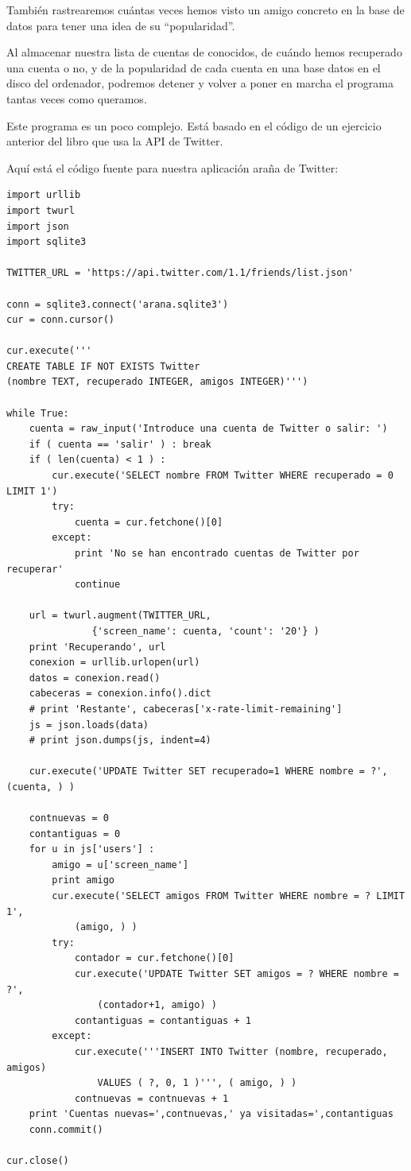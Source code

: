 También rastrearemos cuántas veces hemos visto un amigo concreto en la
base de datos para tener una idea de su ``popularidad''.

Al almacenar nuestra lista de cuentas de conocidos,
de cuándo hemos recuperado una cuenta o no,
y de la popularidad de cada cuenta
en una base datos en el disco del ordenador,
podremos detener y volver a poner en marcha el programa tantas veces como queramos. 

Este programa es un poco complejo. Está basado en el código
de un ejercicio anterior del libro que usa la
API de Twitter.

Aquí está el código fuente para nuestra aplicación araña de Twitter:

\beforeverb
\begin{verbatim}
import urllib
import twurl
import json
import sqlite3

TWITTER_URL = 'https://api.twitter.com/1.1/friends/list.json'

conn = sqlite3.connect('arana.sqlite3')
cur = conn.cursor()

cur.execute('''
CREATE TABLE IF NOT EXISTS Twitter 
(nombre TEXT, recuperado INTEGER, amigos INTEGER)''')

while True:
    cuenta = raw_input('Introduce una cuenta de Twitter o salir: ')
    if ( cuenta == 'salir' ) : break
    if ( len(cuenta) < 1 ) :
        cur.execute('SELECT nombre FROM Twitter WHERE recuperado = 0 LIMIT 1')
        try:
            cuenta = cur.fetchone()[0]
        except:
            print 'No se han encontrado cuentas de Twitter por recuperar'
            continue

    url = twurl.augment(TWITTER_URL, 
               {'screen_name': cuenta, 'count': '20'} )
    print 'Recuperando', url
    conexion = urllib.urlopen(url)
    datos = conexion.read()
    cabeceras = conexion.info().dict
    # print 'Restante', cabeceras['x-rate-limit-remaining']
    js = json.loads(data)
    # print json.dumps(js, indent=4)

    cur.execute('UPDATE Twitter SET recuperado=1 WHERE nombre = ?', (cuenta, ) )

    contnuevas = 0
    contantiguas = 0
    for u in js['users'] :
        amigo = u['screen_name']
        print amigo
        cur.execute('SELECT amigos FROM Twitter WHERE nombre = ? LIMIT 1', 
            (amigo, ) )
        try:
            contador = cur.fetchone()[0]
            cur.execute('UPDATE Twitter SET amigos = ? WHERE nombre = ?', 
                (contador+1, amigo) )
            contantiguas = contantiguas + 1
        except:
            cur.execute('''INSERT INTO Twitter (nombre, recuperado, amigos) 
                VALUES ( ?, 0, 1 )''', ( amigo, ) )
            contnuevas = contnuevas + 1
    print 'Cuentas nuevas=',contnuevas,' ya visitadas=',contantiguas
    conn.commit()

cur.close()
\end{verbatim}
